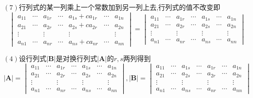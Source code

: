 \begin{green}
\begin{corollary}[列情形]
    $(7)$行列式的某一列乘上一个常数加到另一列上去,行列式的值不改变即\[
    \begin{vmatrix}
       a_{11}&\cdots&a_{1r}&\cdots&a_{1s}+ca_{1r}&\cdots&a_{1n}\\
         a_{21}&\cdots&a_{2r}&\cdots&a_{2s}+ca_{2r}&\cdots&a_{2n}\\
            \vdots& &\vdots& &\vdots& &\vdots\\
            a_{n1}&\cdots&a_{nr}&\cdots&a_{ns}+ca_{nr}&\cdots&a_{nn}
    \end{vmatrix}=
    \begin{vmatrix}
        a_{11}&\cdots&a_{1r}&\cdots&a_{1s}&\cdots&a_{1n}\\
        a_{21}&\cdots&a_{2r}&\cdots&a_{2s}&\cdots&a_{2n}\\
        \vdots& &\vdots& &\vdots& &\vdots\\
        a_{n1}&\cdots&a_{nr}&\cdots&a_{ns}&\cdots&a_{nn}
    \end{vmatrix}
    \]
\end{corollary}
\begin{Proof}
    $(4)$设行列式$\left|\bm{B}\right|$是对换行列式$\left|\bm{A}\right|$的$r,s$两列得到
    \[
    \left|\bm{A}\right|=\begin{vmatrix}
        a_{11}&\cdots&a_{1r}&\cdots&a_{1s}&\cdots&a_{1n}\\
        a_{21}&\cdots&a_{2r}&\cdots&a_{2s}&\cdots&a_{2n}\\
        \vdots& &\vdots& &\vdots& &\vdots\\
        a_{n1}&\cdots&a_{nr}&\cdots&a_{ns}&\cdots&a_{nn}
    \end{vmatrix},\left|\bm{B}\right|=\begin{vmatrix}
        a_{11}&\cdots&a_{1s}&\cdots&a_{1r}&\cdots&a_{1n}\\
        a_{21}&\cdots&a_{2s}&\cdots&a_{2r}&\cdots&a_{2n}\\
        \vdots& &\vdots& &\vdots& &\vdots\\
        a_{n1}&\cdots&a_{ns}&\cdots&a_{nr}&\cdots&a_{nn}
    \end{vmatrix}
    \]\vfill
    

\end{Proof}
\end{green}
